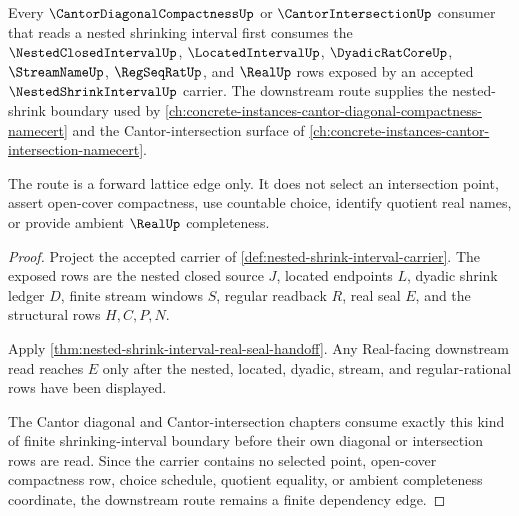 \begin{theorem}
\label{thm:cantor-intersection-nested-shrink-route}
Every $\CantorDiagonalCompactnessUp$ or $\CantorIntersectionUp$ consumer that reads a nested shrinking interval first consumes the $\NestedClosedIntervalUp$, $\LocatedIntervalUp$, $\DyadicRatCoreUp$, $\StreamNameUp$, $\RegSeqRatUp$, and $\RealUp$ rows exposed by an accepted $\NestedShrinkIntervalUp$ carrier. The downstream route supplies the nested-shrink boundary used by \autoref{ch:concrete-instances-cantor-diagonal-compactness-namecert} and the Cantor-intersection surface of \autoref{ch:concrete-instances-cantor-intersection-namecert}.

The route is a forward lattice edge only. It does not select an intersection point, assert open-cover compactness, use countable choice, identify quotient real names, or provide ambient $\RealUp$ completeness.
\end{theorem}
\begin{proof}
Project the accepted carrier of \autoref{def:nested-shrink-interval-carrier}. The exposed rows are the nested closed source $J$, located endpoints $L$, dyadic shrink ledger $D$, finite stream windows $S$, regular readback $R$, real seal $E$, and the structural rows $H,C,P,N$.

Apply \autoref{thm:nested-shrink-interval-real-seal-handoff}. Any Real-facing downstream read reaches $E$ only after the nested, located, dyadic, stream, and regular-rational rows have been displayed.

The Cantor diagonal and Cantor-intersection chapters consume exactly this kind of finite shrinking-interval boundary before their own diagonal or intersection rows are read. Since the carrier contains no selected point, open-cover compactness row, choice schedule, quotient equality, or ambient completeness coordinate, the downstream route remains a finite dependency edge.
\end{proof}


